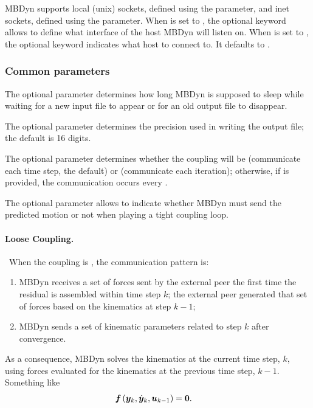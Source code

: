 MBDyn supports local (unix) sockets, defined using the  parameter,
and inet sockets, defined using the  parameter.
When  is set to , the optional keyword 
allows to define what interface of the host MBDyn will listen on.
When  is set to , the optional keyword 
indicates what host to connect to.
It defaults to .




\subsubsection{Common parameters}
The optional parameter  determines how long MBDyn
is supposed to sleep while waiting for a new input file to appear
or for an old output file to disappear.

The optional parameter  determines the precision
used in writing the output file; the default is 16 digits.

The optional parameter  determines whether the coupling
will be  (communicate each time step, the default) or
 (communicate each iteration); otherwise, if 
is provided, the communication occurs every .

The optional parameter  allows to indicate
whether MBDyn must send the predicted motion or not when playing
a tight coupling loop.

\paragraph{Loose Coupling.} \
When the coupling is , the communication pattern is:
\begin{enumerate}
\item MBDyn receives a set of forces sent by the external peer
	the first time the residual is assembled within time step $k$;
	the external peer generated that set of forces
	based on the kinematics at step $k-1$;

\item MBDyn sends a set of kinematic parameters related to step $k$
	after convergence.
\end{enumerate}
As a consequence, MBDyn solves the kinematics at the current time step, $k$,
using forces evaluated for the kinematics at the previous time step, $k-1$.
Something like
\begin{align}
	\boldsymbol{f}\left( \boldsymbol{y}_k, \dot{\boldsymbol{y}}_k, \boldsymbol{u}_{k - 1} \right)
	&=
	\boldsymbol{0}
	.
\end{align}

